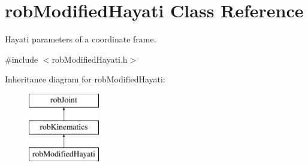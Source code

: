 \hypertarget{classrob_modified_hayati}{\section{rob\-Modified\-Hayati Class Reference}
\label{classrob_modified_hayati}
}


Hayati parameters of a coordinate frame.  




{\ttfamily \#include $<$rob\-Modified\-Hayati.\-h$>$}

Inheritance diagram for rob\-Modified\-Hayati\-:\begin{figure}[H]
\begin{center}
\leavevmode
\includegraphics[height=3.000000cm]{d6/d44/classrob_modified_hayati}
\end{center}
\end{figure}
